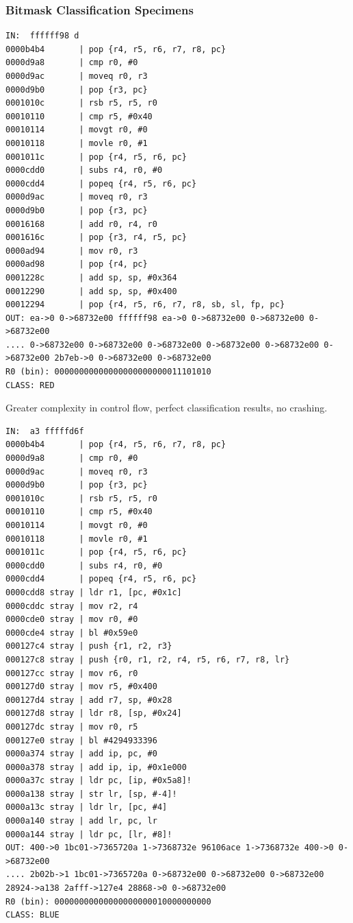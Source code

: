 \documentclass[11pt]{article}
\begin{document}
\subsubsection*{Bitmask Classification Specimens}
\label{sec:org9a9ebff}
\begin{verbatim}
IN:  ffffff98 d
0000b4b4       | pop {r4, r5, r6, r7, r8, pc}
0000d9a8       | cmp r0, #0
0000d9ac       | moveq r0, r3
0000d9b0       | pop {r3, pc}
0001010c       | rsb r5, r5, r0
00010110       | cmp r5, #0x40
00010114       | movgt r0, #0
00010118       | movle r0, #1
0001011c       | pop {r4, r5, r6, pc}
0000cdd0       | subs r4, r0, #0
0000cdd4       | popeq {r4, r5, r6, pc}
0000d9ac       | moveq r0, r3
0000d9b0       | pop {r3, pc}
00016168       | add r0, r4, r0
0001616c       | pop {r3, r4, r5, pc}
0000ad94       | mov r0, r3
0000ad98       | pop {r4, pc}
0001228c       | add sp, sp, #0x364
00012290       | add sp, sp, #0x400
00012294       | pop {r4, r5, r6, r7, r8, sb, sl, fp, pc}
OUT: ea->0 0->68732e00 ffffff98 ea->0 0->68732e00 0->68732e00 0->68732e00 
.... 0->68732e00 0->68732e00 0->68732e00 0->68732e00 0->68732e00 0->68732e00 2b7eb->0 0->68732e00 0->68732e00 
R0 (bin): 00000000000000000000000011101010
CLASS: RED
\end{verbatim}
Greater complexity in control flow, perfect classification results, no crashing.
\begin{verbatim}
IN:  a3 fffffd6f
0000b4b4       | pop {r4, r5, r6, r7, r8, pc}
0000d9a8       | cmp r0, #0
0000d9ac       | moveq r0, r3
0000d9b0       | pop {r3, pc}
0001010c       | rsb r5, r5, r0
00010110       | cmp r5, #0x40
00010114       | movgt r0, #0
00010118       | movle r0, #1
0001011c       | pop {r4, r5, r6, pc}
0000cdd0       | subs r4, r0, #0
0000cdd4       | popeq {r4, r5, r6, pc}
0000cdd8 stray | ldr r1, [pc, #0x1c]
0000cddc stray | mov r2, r4
0000cde0 stray | mov r0, #0
0000cde4 stray | bl #0x59e0
000127c4 stray | push {r1, r2, r3}
000127c8 stray | push {r0, r1, r2, r4, r5, r6, r7, r8, lr}
000127cc stray | mov r6, r0
000127d0 stray | mov r5, #0x400
000127d4 stray | add r7, sp, #0x28
000127d8 stray | ldr r8, [sp, #0x24]
000127dc stray | mov r0, r5
000127e0 stray | bl #4294933396
0000a374 stray | add ip, pc, #0
0000a378 stray | add ip, ip, #0x1e000
0000a37c stray | ldr pc, [ip, #0x5a8]!
0000a138 stray | str lr, [sp, #-4]!
0000a13c stray | ldr lr, [pc, #4]
0000a140 stray | add lr, pc, lr
0000a144 stray | ldr pc, [lr, #8]!
OUT: 400->0 1bc01->7365720a 1->7368732e 96106ace 1->7368732e 400->0 0->68732e00 
.... 2b02b->1 1bc01->7365720a 0->68732e00 0->68732e00 0->68732e00 28924->a138 2afff->127e4 28868->0 0->68732e00 
R0 (bin): 00000000000000000000010000000000
CLASS: BLUE
\end{verbatim}
\end{document}
